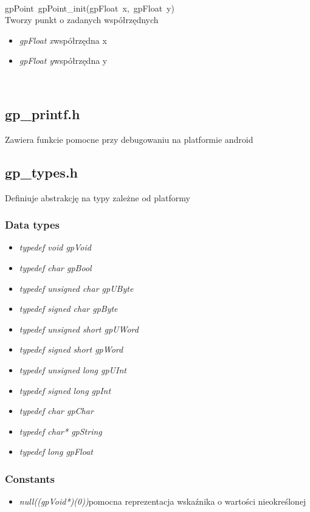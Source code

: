  \ \\
\mbox{\textsf{gpPoint gpPoint_init(gpFloat x, gpFloat y)}} \\ \indent Tworzy punkt o zadanych współrzędnych
	\begin{itemize}
		\item \textit{gpFloat x}\quad współrzędna x
		\item \textit{gpFloat y}\quad współrzędna y
	\end{itemize}

 \ \\

\subsection{gp_printf.h}
Zawiera funkcie pomocne przy debugowaniu na platformie android

\subsection{gp_types.h}
Definiuje abstrakcję na typy zależne od platformy
\subsubsection{Data types}
\begin{itemize}
\item \textit{typedef void gpVoid}
\item \textit{typedef char gpBool}
\item \textit{typedef unsigned char gpUByte}
\item \textit{typedef signed char gpByte}
\item \textit{typedef unsigned short gpUWord}
\item \textit{typedef signed short gpWord}
\item \textit{typedef unsigned long gpUInt}
\item \textit{typedef signed long gpInt}
\item \textit{typedef char gpChar}
\item \textit{typedef char* gpString}
\item \textit{typedef long gpFloat}
\end{itemize}
\subsubsection{Constants}
\begin{itemize}
\item \textit{null\quad ((gpVoid*)(0))}\qquad pomocna reprezentacja wskaźnika o wartości nieokreślonej
\end{itemize}

